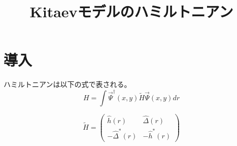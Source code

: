 \documentclass{jarticle}
\begin{document}
\title{Kitaevモデルのハミルトニアン}

\maketitle

\tableofcontents


\section{導入}

ハミルトニアンは以下の式で表される。
\begin{equation}
  H=\int\vec{\Psi}^\dagger(x,y)\tilde{H}\vec{\Psi}(x,y)dr
\end{equation}

\begin{equation}
\tilde{H}=
\begin{pmatrix}
	\hat{h}(r) & \hat{\Delta}(r) \\ 
	-\hat{\Delta}^{*}(r) & -\hat{h}^{*}(r)
\end{pmatrix} 
\end{equation}
\end{document}
